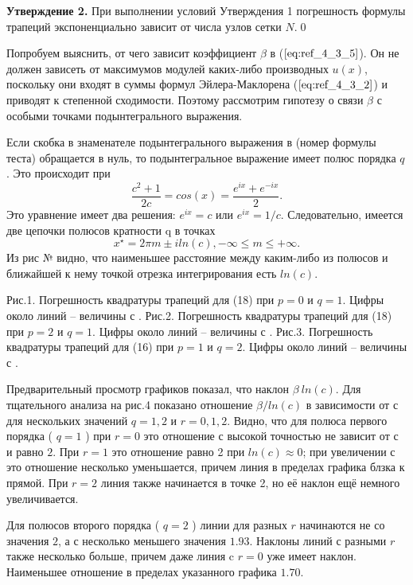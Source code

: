 \textbf{Утверждение 2.} При выполнении условий Утверждения 1 погрешность
формулы трапеций экспоненциально зависит от числа узлов сетки $N$.\qed

Попробуем выяснить, от чего зависит коэффициент $\beta$ в ($\ref{eq:ref_4_3_5}$). Он не
должен зависеть от максимумов модулей каких-либо производных $u(x)$,
поскольку они входят в суммы формул Эйлера-Маклорена ($\ref{eq:ref_4_3_2}$) и приводят к
степенной сходимости. Поэтому рассмотрим гипотезу о связи $\beta$ с особыми точками
подынтегрального выражения.

Если скобка в знаменателе подынтегрального выражения в (номер формулы теста) обращается в нуль, то подынтегральное выражение имеет полюс порядка $q$. Это происходит при
\begin{equation}
\frac{c^{2} + 1}{2c}=cos(x)=\frac{e^{ix}+e^{-ix}}{2}.
\end{equation}
Это уравнение имеет два решения: $e^{ix}=c$ или $e^{ix}=1/c$. Следовательно, имеется две цепочки полюсов кратности q в точках
\begin{equation}
x^{\star} = 2\pi m \pm iln(c),-\infty \leqslant m \leqslant +\infty.
\end{equation}
Из рис № видно, что наименьшее расстояние между каким-либо из полюсов и ближайшей к нему
точкой отрезка интегрирования есть $ln(c)$.

Рис.1. Погрешность квадратуры трапеций для (18) при $p = 0$ и $q =1$.
Цифры около линий – величины с .
Рис.2. Погрешность квадратуры трапеций для (18) при $p = 2$ и $q =1$.
Цифры около линий – величины с .
Рис.3. Погрешность квадратуры трапеций для (16) при $p =1$ и $q = 2$.
Цифры около линий – величины с .

Предварительный просмотр графиков показал, что наклон $\beta ~ ln(c)$. Для
тщательного анализа на рис.4 показано отношение $\beta / ln(c)$ в зависимости от $с$
для нескольких значений $q =1,2$ и $r = 0,1,2$. Видно, что для полюса первого
порядка ( $q =1$ ) при $r=0$ это отношение с высокой точностью не зависит от
$с$ и равно $2$. При $r=1$ это отношение равно 2 при $ln(c) \approx 0$; при увеличении с это отношение несколько уменьшается, причем линия в пределах графика блзка к прямой. При $r=2$ линия также начинается в точке 2, но её наклон ещё немного увеличивается.

Для полюсов второго порядка ( $q = 2$ ) линии для разных $r$ начинаются не со значения $2$, а с несколько меньшего значения $1.93$. Наклоны линий с разными $r$ также несколько больше, причем даже линия c $r=0$ уже имеет наклон. Наименьшее отношение в пределах указанного графика $1.70$.

